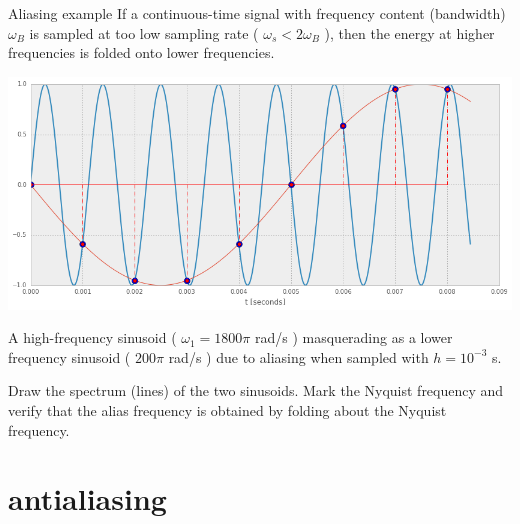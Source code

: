 \documentclass[presentation,aspectratio=169]{beamer}
\begin{document}
\begin{frame}[label={sec:orgf12cdf1}]{Aliasing example}
If a continuous-time signal with frequency content (bandwidth) \(\omega_B\) is sampled at too low sampling rate ( \(\omega_s < 2\omega_B\) ), then the energy at higher frequencies is folded onto lower frequencies. 

\begin{center}
\includegraphics[width=0.6\linewidth]{../../figures/aliasing-example.png}
\end{center}
A high-frequency sinusoid ( \(\omega_1 = 1800\pi\) rad/s ) masquerading as a lower frequency sinusoid ( \(200 \pi\) rad/s ) due to aliasing when sampled with \(h=10^{-3}\) s.

\alert{Draw the spectrum (lines) of the two sinusoids. Mark the Nyquist frequency and verify that the alias frequency is obtained by folding about the Nyquist frequency.}
\end{frame}



\section{antialiasing}
\label{sec:org9130c47}
\end{document}
